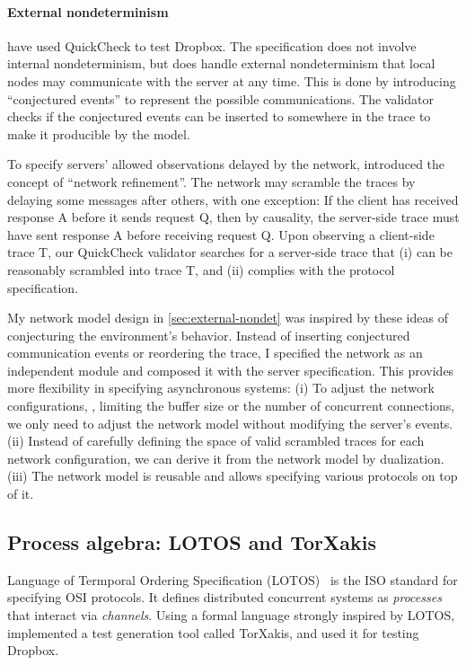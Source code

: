 \paragraph{External nondeterminism}
\citet{testing-dropbox} have used QuickCheck to test Dropbox.  The specification
does not involve internal nondeterminism, but does handle external
nondeterminism that local nodes may communicate with the server at any time.
This is done by introducing ``conjectured events'' to represent the possible
communications.  The validator checks if the conjectured events can be inserted
to somewhere in the trace to make it producible by the model.

To specify servers' allowed observations delayed by the network, \citet{cpp19}
introduced the concept of ``network refinement''.  The network may scramble the
traces by delaying some messages after others, with one exception: If the client
has received response \ilc A before it sends request \ilc Q, then by causality,
the server-side trace must have sent response \ilc A before receiving request
\ilc Q.  Upon observing a client-side trace \ilc T, our QuickCheck validator
searches for a server-side trace that (i) can be reasonably scrambled into trace
\ilc T, and (ii) complies with the protocol specification.

My network model design in \autoref{sec:external-nondet} was inspired by these
ideas of conjecturing the environment's behavior.  Instead of inserting
conjectured communication events or reordering the trace, I specified the
network as an independent module and composed it with the server specification.
This provides more flexibility in specifying asynchronous systems: (i) To adjust
the network configurations, \eg, limiting the buffer size or the number of
concurrent connections, we only need to adjust the network model without
modifying the server's events.  (ii) Instead of carefully defining the space of
valid scrambled traces for each network configuration, we can derive it from the
network model by dualization.  (iii) The network model is reusable and allows
specifying various protocols on top of it.

\subsection{Process algebra: LOTOS and TorXakis}
Language of Termporal Ordering Specification (LOTOS)~\cite{lotos} is the ISO
standard for specifying OSI protocols.  It defines distributed concurrent
systems as {\em processes} that interact via {\em channels}.  Using a formal
language strongly inspired by LOTOS, \citet{torxakis-dropbox} implemented a test
generation tool called TorXakis, and used it for testing Dropbox.

